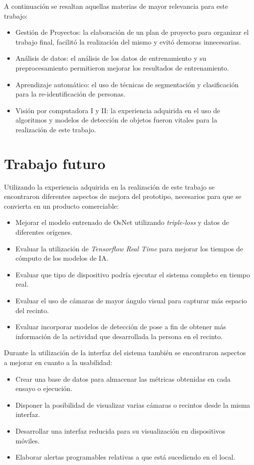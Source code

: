 A continuación se resaltan aquellas materias de mayor relevancia para este trabajo:
\begin{itemize}
\item Gestión de Proyectos: la elaboración de un plan de proyecto para organizar el trabajo final, facilitó la realización del mismo y evitó demoras innecesarias.
\item Análisis de datos: el análisis de los datos de entrenamiento y su preprocesamiento permitieron mejorar los resultados de entrenamiento.
\item Aprendizaje automático: el uso de técnicas de segmentación y clasificación para la re-identificación de personas.
\item Visión por computadora I y II: la experiencia adquirida en el uso de algoritmos y modelos de detección de objetos fueron vitales para la realización de este trabajo.
\end{itemize}

\section{Trabajo futuro}

Utilizando la experiencia adquirida en la realización de este trabajo se encontraron diferentes aspectos de mejora del prototipo, necesarios para que se convierta en un producto comerciable:

\begin{itemize}
\item Mejorar el modelo entrenado de OsNet utilizando \textit{triple-loss} y datos de diferentes orígenes.
\item Evaluar la utilización de \textit{Tensorflow Real Time} para mejorar los tiempos de cómputo de los modelos de IA.
\item Evaluar que tipo de dispositivo podría ejecutar el sistema completo en tiempo real.
\item Evaluar el uso de cámaras de mayor ángulo visual para capturar más espacio del recinto.
\item Evaluar incorporar modelos de detección de pose a fin de obtener más información de la actividad que desarrollada la persona en el recinto.
\end{itemize}

Durante la utilización de la interfaz del sistema también se encontraron aspectos a mejorar en cuanto a la usabilidad:
\begin{itemize}
\item Crear una base de datos para almacenar las métricas obtenidas en cada ensayo o ejecución.
\item Disponer la posibilidad de visualizar varias cámaras o recintos desde la misma interfaz.
\item Desarrollar una interfaz reducida para su visualización en dispositivos móviles.
\item Elaborar alertas programables relativas a que está sucediendo en el local.
\end{itemize}
